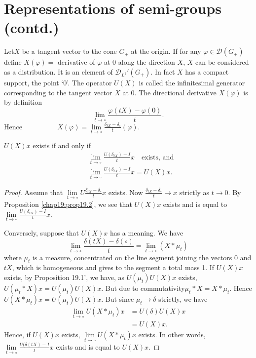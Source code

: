 
\chapter{Representations of semi-groups (contd.)}\label{chap20}

Let\pageoriginale $X$ be a tangent vector to the cone $G_+$ at the
origin. If for any $\varphi\in\mathscr{D}(G_+)$ define $X(\varphi)=$
derivative of $\varphi$ at $0$ along the direction $X$, $X$ can be
considered as a distribution. It is an element of $\mathscr{D}_{L^1}'
(G_+)$. In fact $X$ has a compact support, the point `0'. The
operator $U(X)$ is called the infinitesimal generator corresponding to
the tangent vector $X$ at $0$. The directional derivative $X(\varphi)$
is by definition
$$
\lim\limits_{t\to\circ}\frac{\varphi(t X)-\varphi(0)}{t}.
$$
Hence $\hspace{2cm} X(\varphi)=
\lim\limits_{t\to\circ}\frac{\delta_{tX}-\delta_\circ}{t}(\varphi)$.

\setcounter{section}{20}
\setcounter{prop}{0}
\begin{prop}\label{chap20:prop20.1}
$U(X)x$ exists if and only if 
\begin{align*}
&\lim\limits_{t\to\circ}\frac{U(\delta_{tX})-I}{t}x \quad
  \text{exists, and}\\
&\lim\limits_{t\to\circ}\frac{U(\delta_{tX})-I}{t}x=U(X)x.
\end{align*}
\end{prop}

\begin{proof}
Assume that $\lim\limits_{t\to\circ}U
\frac{\delta_{tX}-\delta_\circ}{t}x$ exists. Now
$\frac{\delta_{tX}-\delta_\circ}{t}\to x$ strictly as $t\to 0$. By
Proposition \ref{chap19:prop19.2}, we see that $U(X)x$ exists and is
equal to $\lim\limits_{t\to\circ}\frac{U(\delta_{tX})-I}{t}x$. 

Conversely, suppose that $U(X)x$ has a meaning. We have
$$\lim\limits_{t\to\circ} \frac{\delta(tX)-\delta(\circ)}{t}=
\lim\limits_{t\to\circ}(X*\mu_t)$$ 
where $\mu_t$ is a measure,
concentrated on the line segment joining the vectors $0$ and $tX$,
which is homogeneous and gives to the segment a total mass 1. If
$U(X)x$ exists, by Proposition 19.1', we have, as
$U(\mu_t) U(X)x$ exists, $U(\mu_t*X)x=U(\mu_t) U(X)x$. But due to
commutativity\pageoriginale $\mu_t*X=X*\mu_t$. Hence $U(X*\mu_t)x=U
(\mu_t) U(X)x$. But since $\mu_t\to\delta$ strictly, we have
\begin{align*}
\lim\limits_{t\to\circ}U(X*\mu_t)x &= U(\delta) U(X)x\\
&=U(X)x.
\end{align*}
Hence, if $U(X)x$ exists, $\lim\limits_{t\to\circ}U(X*\mu_t)x$
exists. In other words,\break $\lim\limits_{t\to\circ} \frac{U(\delta
  (tX)-I}{t}x$ exists and is equal to $U(X)x$.
\end{proof}

